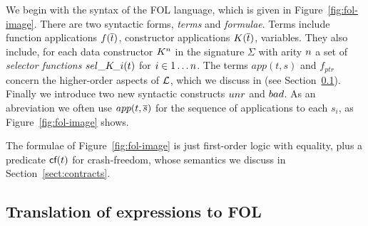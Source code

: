 We begin with the syntax of the FOL language, which is given in
Figure~\ref{fig:fol-image}. There are two syntactic forms,
\emph{terms} and \emph{formulae}. Terms include function applications
$f(\overline{t})$, constructor applications $K(\overline{t})$, variables. They
also include, for each data constructor $K^n$ in the signature
$\Sigma$ with arity $n$ a set of {\em selector functions}
$\mathop{sel\_K\!\_i}(t)$ for $i \in 1 \ldots n$.  The terms $app(t,s)$ and
$f_{ptr}$ concern the higher-order aspects of $\cal L$, which we
discuss in (see Section~\ref{s:hof}).  Finally we introduce two new
syntactic constructs $\mathop{unr}$ and $\mathop{bad}$. As an abreviation we often use
$app(t,\overline{s})$ for the sequence of applications to each $s_i$, as
Figure~\ref{fig:fol-image} shows.

The formulae of Figure~\ref{fig:fol-image} is just first-order logic
with equality, plus a predicate $\textsf{cf}(t)$ for crash-freedom, whose
semantics we discuss in Section~\ref{sect:contracts}.

\subsection{Translation of expressions to FOL} \label{s:hof}

